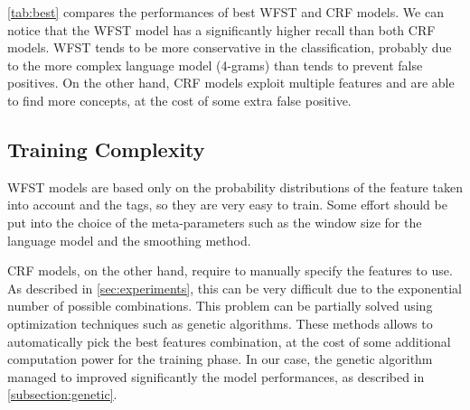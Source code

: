 \cref{tab:best} compares the performances of best \ac{WFST} and \ac{CRF} models.
We can notice that the \ac{WFST} model has a significantly higher recall than both \ac{CRF} models.
\ac{WFST} tends to be more conservative in the classification, probably due to the more complex language model (4-grams) than tends to prevent false positives.
On the other hand, \ac{CRF} models exploit multiple features and are able to find more concepts, at the cost of some extra false positive.

\subsection{Training Complexity}
\ac{WFST} models are based only on the probability distributions of the feature taken into account and the tags, so they are very easy to train.
Some effort should be put into the choice of the meta-parameters such as the window size for the language model and the smoothing method.

\ac{CRF} models, on the other hand, require to manually specify the features to use.
As described in \cref{sec:experiments}, this can be very difficult due to the exponential number of possible combinations.
This problem can be partially solved using optimization techniques such as genetic algorithms.
These methods allows to automatically pick the best features combination, at the cost of some additional computation power for the training phase.
In our case, the genetic algorithm managed to improved significantly the model performances, as described in \cref{subsection:genetic}.
